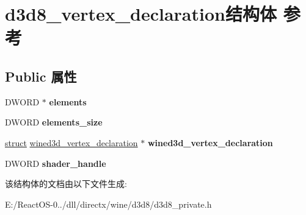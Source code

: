 \hypertarget{structd3d8__vertex__declaration}{}\section{d3d8\+\_\+vertex\+\_\+declaration结构体 参考}
\label{structd3d8__vertex__declaration}
\subsection*{Public 属性}
\begin{DoxyCompactItemize}
\item 
\mbox{\label{structd3d8__vertex__declaration_a4e0dd5060474f5a308e26f70ffe8b70d}} 
D\+W\+O\+RD $\ast$ {\bfseries elements}
\item 
\mbox{\label{structd3d8__vertex__declaration_a5cc1ccf6e822a01cceb8e21caa118f32}} 
D\+W\+O\+RD {\bfseries elements\+\_\+size}
\item 
\mbox{\label{structd3d8__vertex__declaration_abae8ed495a195c97ea12aabe9e77c04f}} 
\hyperlink{interfacestruct}{struct} \hyperlink{structwined3d__vertex__declaration}{wined3d\+\_\+vertex\+\_\+declaration} $\ast$ {\bfseries wined3d\+\_\+vertex\+\_\+declaration}
\item 
\mbox{\label{structd3d8__vertex__declaration_a18f5093901aa4b30e196c5cb9f446c0b}} 
D\+W\+O\+RD {\bfseries shader\+\_\+handle}
\end{DoxyCompactItemize}


该结构体的文档由以下文件生成\+:\begin{DoxyCompactItemize}
\item 
E\+:/\+React\+O\+S-\/0../dll/directx/wine/d3d8/d3d8\+\_\+private.\+h\end{DoxyCompactItemize}

